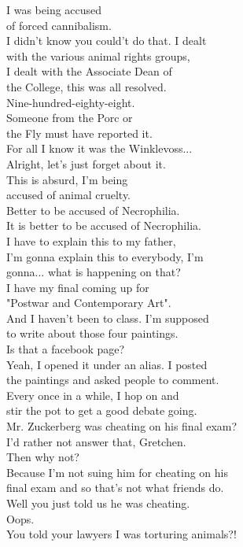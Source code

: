 \documentclass{article}
\begin{document}
\begin{multicols}{3}
I was being accused\\
of forced cannibalism.\\
I didn't know you could't do that. I dealt\\
with the various animal rights groups,\\
I dealt with the Associate Dean of\\
the College, this was all resolved.\\
Nine-hundred-eighty-eight.\\
Someone from the Porc or\\
the Fly must have reported it.\\
For all I know it was the Winklevoss...\\
Alright, let's just forget about it.\\
This is absurd, I'm being\\
accused of animal cruelty.\\
Better to be accused of Necrophilia.\\
It is better to be accused of Necrophilia.\\
I have to explain this to my father,\\
I'm gonna explain this to everybody, I'm\\
gonna... what is happening on that?\\
I have my final coming up for\\
"Postwar and Contemporary Art".\\
And I haven't been to class. I'm supposed\\
to write about those four paintings.\\
Is that a facebook page?\\
Yeah, I opened it under an alias. I posted\\
the paintings and asked people to comment.\\
Every once in a while, I hop on and\\
stir the pot to get a good debate going.\\
Mr. Zuckerberg was cheating on his final exam?\\
I'd rather not answer that, Gretchen.\\
Then why not?\\
Because I'm not suing him for cheating on his\\
final exam and so that's not what friends do.\\
Well you just told us he was cheating.\\
Oops.\\
You told your lawyers I was torturing animals?!\\

\end{multicols}
\end{document}
